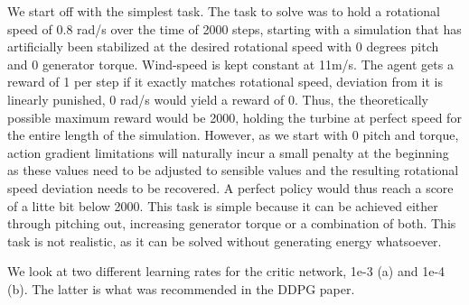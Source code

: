 \documentclass[hyperref,beleg]{cgvpub}
\begin{document}
We start off with the simplest task. The task to solve was to hold a rotational speed of 0.8 rad/s over the time of 2000 steps, starting with a simulation that has artificially been stabilized at the desired rotational speed with 0 degrees pitch and 0 generator torque. Wind-speed is kept constant at 11m/s. The agent gets a reward of 1 per step if it exactly matches rotational speed, deviation from it is linearly punished, 0 rad/s would yield a reward of 0. Thus, the theoretically possible maximum reward would be 2000, holding the turbine at perfect speed for the entire length of the simulation. However, as we start with 0 pitch and torque, action gradient limitations will naturally incur a small penalty at the beginning as these values need to be adjusted to sensible values and the resulting rotational speed deviation needs to be recovered. A perfect policy would thus reach a score of a litte bit below 2000. This task is simple because it can be achieved either through pitching out, increasing generator torque or a combination of both. This task is not realistic, as it can be solved without generating energy whatsoever.

We look at two different learning rates for the critic network, 1e-3 (a) and 1e-4 (b). The latter is what was recommended in the DDPG paper.
\end{document}
